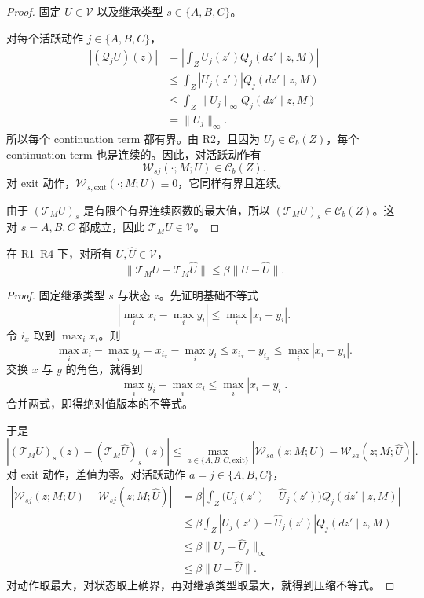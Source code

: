 \begin{proof}
固定 $U\in\mathcal V$ 以及继承类型 $s\in\{A,B,C\}$。

对每个活跃动作 $j\in\{A,B,C\}$，
\begin{align*}
|(\mathcal Q_jU)(z)|
&=
\left|\int_Z U_j(z')Q_j(dz'\mid z,M)\right|\\
&\le
\int_Z |U_j(z')|Q_j(dz'\mid z,M)\\
&\le
\int_Z \|U_j\|_\infty Q_j(dz'\mid z,M)\\
&=
\|U_j\|_\infty.
\end{align*}
所以每个 continuation term 都有界。由 R2，且因为 $U_j\in\mathcal C_b(Z)$，每个 continuation term 也是连续的。因此，对活跃动作有
\[
\mathcal W_{sj}(\cdot;M;U)\in\mathcal C_b(Z).
\]
对 exit 动作，$\mathcal W_{s,\mathrm{exit}}(\cdot;M;U)\equiv 0$，它同样有界且连续。

由于 $(\mathcal T_MU)_s$ 是有限个有界连续函数的最大值，所以 $(\mathcal T_MU)_s\in\mathcal C_b(Z)$。这对 $s=A,B,C$ 都成立，因此 $\mathcal T_MU\in\mathcal V$。
\end{proof}

\begin{lemma}
在 R1--R4 下，对所有 $U,\widehat U\in\mathcal V$，
\[
\|\mathcal T_MU-\mathcal T_M\widehat U\|\le\beta\|U-\widehat U\|.
\]
\end{lemma}

\begin{proof}
固定继承类型 $s$ 与状态 $z$。先证明基础不等式
\[
|\max_i x_i-\max_i y_i|\le\max_i|x_i-y_i|.
\]
令 $i_x$ 取到 $\max_i x_i$。则
\[
\max_i x_i-\max_i y_i=x_{i_x}-\max_i y_i\le x_{i_x}-y_{i_x}\le \max_i|x_i-y_i|.
\]
交换 $x$ 与 $y$ 的角色，就得到
\[
\max_i y_i-\max_i x_i\le \max_i|x_i-y_i|.
\]
合并两式，即得绝对值版本的不等式。

于是
\[
|(\mathcal T_MU)_s(z)-(\mathcal T_M\widehat U)_s(z)|
\le\max_{a\in\{A,B,C,\mathrm{exit}\}}|\mathcal W_{sa}(z;M;U)-\mathcal W_{sa}(z;M;\widehat U)|.
\]
对 exit 动作，差值为零。对活跃动作 $a=j\in\{A,B,C\}$，
\begin{align*}
|\mathcal W_{sj}(z;M;U)-\mathcal W_{sj}(z;M;\widehat U)|
&=\beta\left|\int_Z \bigl(U_j(z')-\widehat U_j(z')\bigr)Q_j(dz'\mid z,M)\right|\\
&\le\beta\int_Z |U_j(z')-\widehat U_j(z')|Q_j(dz'\mid z,M)\\
&\le\beta\|U_j-\widehat U_j\|_\infty\\
&\le\beta\|U-\widehat U\|.
\end{align*}
对动作取最大，对状态取上确界，再对继承类型取最大，就得到压缩不等式。
\end{proof}


